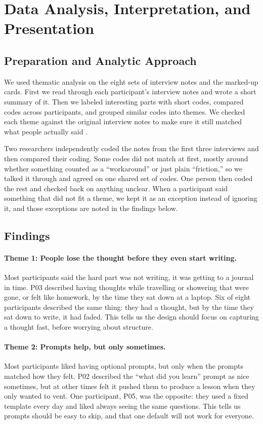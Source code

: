 \documentclass[sigconf,nonacm]{acmart}
\begin{document}
\section{Data Analysis, Interpretation, and Presentation}

\subsection{Preparation and Analytic Approach}

We used thematic analysis on the eight sets of interview notes and the marked-up
cards. First we read through each participant's interview notes and wrote a short summary of it.
Then we labeled interesting parts with short codes, compared codes across
participants, and grouped similar codes into themes. We checked each theme
against the original interview notes to make sure it still matched what people
actually said \cite{braun2006thematic}.

Two researchers independently coded the notes from the first three interviews and then compared
their coding. Some codes did not match at first, mostly around whether something
counted as a ``workaround'' or just plain ``friction,'' so we talked it
through and agreed on one shared set of codes. One person then coded the rest
and checked back on anything unclear. When a participant said something that
did not fit a theme, we kept it as an exception instead of ignoring it, and
those exceptions are noted in the findings below.



\subsection{Findings}
\label{sec:findings}

\paragraph{Theme 1: People lose the thought before they even start writing.}
Most participants said the hard part was not writing, it was getting to a
journal in time. P03 described having thoughts while travelling or showering
that were gone, or felt like homework, by the time they sat down at a laptop.
Six of eight participants described the same thing: they had a thought, but
by the time they sat down to write, it had faded. This tells us the design
should focus on capturing a thought fast, before worrying about structure.

\paragraph{Theme 2: Prompts help, but only sometimes.} Most participants liked
having optional prompts, but only when the prompts matched how they felt. P02
described the ``what did you learn'' prompt as nice sometimes, but at other
times felt it pushed them to produce a lesson when they only wanted to vent.
One participant, P05, was the opposite: they used a fixed template every day
and liked always seeing the same questions. This tells us prompts should be
easy to skip, and that one default will not work for everyone.
\end{document}
